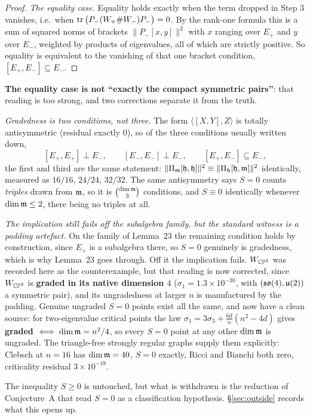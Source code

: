 \begin{proof}
\emph{The equality case.} Equality holds exactly when the term dropped in Step 3 vanishes, i.e.\ when $\operatorname{tr}\big(P_-(W_+\#W_-)P_-\big)=0$. By the rank-one formula this is a sum of squared norms of brackets $\big\|P_-[x,y]\big\|^2$ with $x$ ranging over $E_+$ and $y$ over $E_-$, weighted by products of eigenvalues, all of which are strictly positive. So equality is equivalent to the vanishing of that one bracket condition, $[E_+,E_-]\subseteq E_-$.
\end{proof}

\begin{remarkstar}
\textbf{The equality case is not ``exactly the compact symmetric pairs''}: that reading is too strong, and two corrections separate it from the truth.

\emph{Gradedness is two conditions, not three.} The form $\langle[X,Y],Z\rangle$ is totally antisymmetric (residual exactly $0$), so of the three conditions usually written down,
\[
[E_+,E_+]\perp E_-,\qquad [E_-,E_-]\perp E_-,\qquad [E_+,E_-]\subseteq E_- ,
\]
the first and third are the same statement: $\|\Pi_{\mathfrak{m}}[\mathfrak{h},\mathfrak{h}]\|^2\equiv\|\Pi_{\mathfrak{h}}[\mathfrak{h},\mathfrak{m}]\|^2$ identically, measured as $16/16$, $24/24$, $32/32$. The same antisymmetry says $S=0$ counts \emph{triples} drawn from $\mathfrak{m}$, so it is $\binom{\dim\mathfrak{m}}3$ conditions, and $S\equiv0$ identically whenever $\dim\mathfrak{m}\le2$, there being no triples at all.

\emph{The implication still fails off the subalgebra family, but the standard witness is a padding artefact.} On the family of Lemma~23 the remaining condition holds by construction, since $E_+$ is a subalgebra there, so $S=0$ genuinely is gradedness, which is why Lemma~23 goes through. Off it the implication fails. $W_{\mathbb{CP}^2}$ was recorded here as the counterexample, but that reading is now corrected, since $W_{\mathbb{CP}^2}$ is \textbf{graded in its native dimension $4$} ($\sigma_1=1.3\times10^{-30}$, with $(\mathfrak{so}(4),\mathfrak{u}(2))$ a symmetric pair), and its ungradedness at larger $n$ is manufactured by the padding. Genuine ungraded $S=0$ points exist all the same, and now have a clean source: for two-eigenvalue critical points the law $\sigma_1=3\sigma_3+\tfrac{6d}n(n^2-4d)$ gives \textbf{graded $\iff\dim\mathfrak{m}=n^2/4$}, so every $S=0$ point at any other $\dim\mathfrak{m}$ is ungraded. The triangle-free strongly regular graphs supply them explicitly: Clebsch at $n=16$ has $\dim\mathfrak{m}=40$, $S=0$ exactly, Ricci and Bianchi both zero, criticality residual $3\times10^{-18}$.

The inequality $S\ge0$ is untouched, but what is withdrawn is the reduction of Conjecture~A that read $S=0$ as a classification hypothesis. \S\ref{sec:outside} records what this opens up.
\end{remarkstar}

